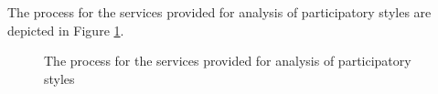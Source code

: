 The process for the services provided for analysis of participatory styles are depicted in Figure \ref{fig:PStyle_process}.

\begin{figure}[htb]
\begin{center}
\end{center}
\caption{The process for the services provided for analysis of participatory styles  \label{fig:PStyle_process}}
\end{figure}
